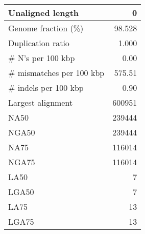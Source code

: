 \documentclass[12pt,a4paper]{article}
\begin{document}
\begin{table}[ht]
\begin{center}
\begin{tabular}{|l*{1}{|r}|}
Unaligned length & 0 \\ \hline
Genome fraction (\%) & 98.528 \\ \hline
Duplication ratio & 1.000 \\ \hline
\# N's per 100 kbp & 0.00 \\ \hline
\# mismatches per 100 kbp & 575.51 \\ \hline
\# indels per 100 kbp & 0.90 \\ \hline
Largest alignment & 600951 \\ \hline
NA50 & 239444 \\ \hline
NGA50 & 239444 \\ \hline
NA75 & 116014 \\ \hline
NGA75 & 116014 \\ \hline
LA50 & 7 \\ \hline
LGA50 & 7 \\ \hline
LA75 & 13 \\ \hline
LGA75 & 13 \\ \hline
\end{tabular}
\end{center}
\end{table}
\end{document}
